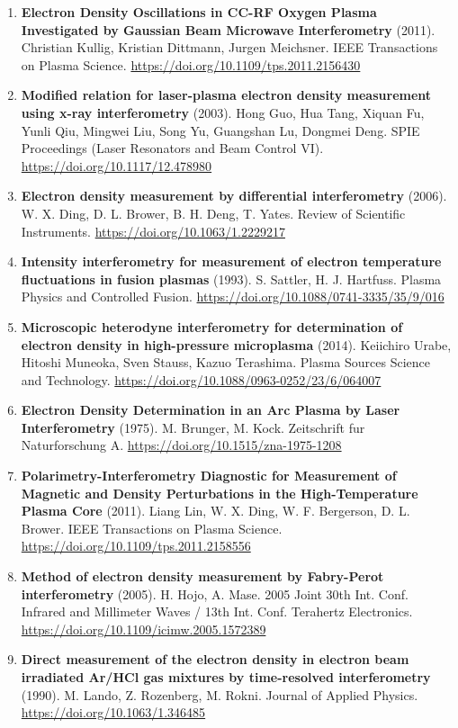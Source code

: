 \documentclass[11pt,a4paper]{article}
\begin{document}
\begin{enumerate}[leftmargin=1.4em]
\item \textbf{Electron Density Oscillations in CC-RF Oxygen Plasma Investigated by Gaussian Beam Microwave Interferometry} (2011). Christian Kullig, Kristian Dittmann, Jurgen Meichsner. IEEE Transactions on Plasma Science. \url{https://doi.org/10.1109/tps.2011.2156430}
\item \textbf{Modified relation for laser-plasma electron density measurement using x-ray interferometry} (2003). Hong Guo, Hua Tang, Xiquan Fu, Yunli Qiu, Mingwei Liu, Song Yu, Guangshan Lu, Dongmei Deng. SPIE Proceedings (Laser Resonators and Beam Control VI). \url{https://doi.org/10.1117/12.478980}
\item \textbf{Electron density measurement by differential interferometry} (2006). W. X. Ding, D. L. Brower, B. H. Deng, T. Yates. Review of Scientific Instruments. \url{https://doi.org/10.1063/1.2229217}
\item \textbf{Intensity interferometry for measurement of electron temperature fluctuations in fusion plasmas} (1993). S. Sattler, H. J. Hartfuss. Plasma Physics and Controlled Fusion. \url{https://doi.org/10.1088/0741-3335/35/9/016}
\item \textbf{Microscopic heterodyne interferometry for determination of electron density in high-pressure microplasma} (2014). Keiichiro Urabe, Hitoshi Muneoka, Sven Stauss, Kazuo Terashima. Plasma Sources Science and Technology. \url{https://doi.org/10.1088/0963-0252/23/6/064007}
\item \textbf{Electron Density Determination in an Arc Plasma by Laser Interferometry} (1975). M. Brunger, M. Kock. Zeitschrift fur Naturforschung A. \url{https://doi.org/10.1515/zna-1975-1208}
\item \textbf{Polarimetry-Interferometry Diagnostic for Measurement of Magnetic and Density Perturbations in the High-Temperature Plasma Core} (2011). Liang Lin, W. X. Ding, W. F. Bergerson, D. L. Brower. IEEE Transactions on Plasma Science. \url{https://doi.org/10.1109/tps.2011.2158556}
\item \textbf{Method of electron density measurement by Fabry-Perot interferometry} (2005). H. Hojo, A. Mase. 2005 Joint 30th Int. Conf. Infrared and Millimeter Waves / 13th Int. Conf. Terahertz Electronics. \url{https://doi.org/10.1109/icimw.2005.1572389}
\item \textbf{Direct measurement of the electron density in electron beam irradiated Ar/HCl gas mixtures by time-resolved interferometry} (1990). M. Lando, Z. Rozenberg, M. Rokni. Journal of Applied Physics. \url{https://doi.org/10.1063/1.346485}

\end{enumerate}
\end{document}
